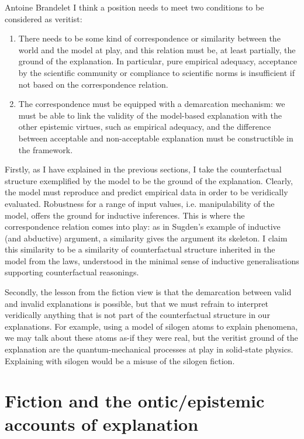\begin{artengenv}{Antoine Brandelet}
I think a position needs to meet two conditions to be considered as veritist:

\begin{enumerate}
    \item There needs to be some kind of correspondence or similarity between the world and the model at play, and this relation must be, at least partially, the ground of the explanation. In particular, pure empirical adequacy, acceptance by the scientific community or compliance to scientific norms is insufficient if not based on the correspondence relation.
    \item The correspondence must be equipped with a demarcation mechanism: we must be able to link the validity of the model-based explanation with the other epistemic virtues, such as empirical adequacy, and the difference between acceptable and non-acceptable explanation must be constructible in the framework.
\end{enumerate}

Firstly, as I have explained in the previous sections, I take the counterfactual structure exemplified by the model to be the ground of the explanation. Clearly, the model must reproduce and predict empirical data in order to be veridically evaluated. Robustness for a range of input values, i.e. manipulability of the model, offers the ground for inductive inferences. This is where the correspondence relation comes into play: as in Sugden's example of inductive (and abductive) argument, a similarity gives the argument its skeleton. I claim this similarity to be a similarity of counterfactual structure inherited in the model from the laws, understood in the minimal sense of inductive generalisations supporting counterfactual reasonings.

Secondly, the lesson from the fiction view is that the demarcation between valid and invalid explanations is possible, but that we must refrain to interpret veridically anything that is not part of the counterfactual structure in our explanations. For example, using a model of silogen atoms to explain phenomena, we may talk about these atoms as-if they were real, but the veritist ground of the explanation are the quantum-mechanical processes at play in solid-state physics. Explaining with silogen would be a misuse of the silogen fiction.


\section{Fiction and the ontic/epistemic accounts of explanation}
\label{sec:ocec}


\end{artengenv}
